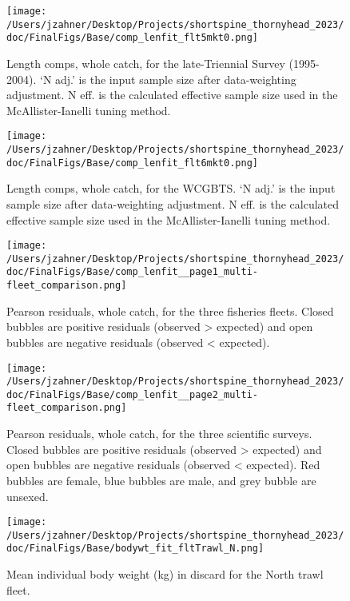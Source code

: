 \documentclass[11pt,
  english,
  letterpaper,
]{article}
\begin{document}
\begin{figure}
\centering
\texttt{[image: /Users/jzahner/Desktop/Projects/shortspine\_thornyhead\_2023/doc/FinalFigs/Base/comp\_lenfit\_flt5mkt0.png]}
\caption{Length comps, whole catch, for the late-Triennial Survey (1995-2004). `N adj.' is the input sample size after data-weighting adjustment. N eff. is the calculated effective sample size used in the McAllister-Ianelli tuning method.\label{fig:fits_ltri}}
\end{figure}

\begin{figure}
\centering
\texttt{[image: /Users/jzahner/Desktop/Projects/shortspine\_thornyhead\_2023/doc/FinalFigs/Base/comp\_lenfit\_flt6mkt0.png]}
\caption{Length comps, whole catch, for the WCGBTS. `N adj.' is the input sample size after data-weighting adjustment. N eff. is the calculated effective sample size used in the McAllister-Ianelli tuning method.\label{fig:fits_wcgbts}}
\end{figure}

\begin{figure}
\centering
\texttt{[image: /Users/jzahner/Desktop/Projects/shortspine\_thornyhead\_2023/doc/FinalFigs/Base/comp\_lenfit\_\_page1\_multi-fleet\_comparison.png]}
\caption{Pearson residuals, whole catch, for the three fisheries fleets. Closed bubbles are positive residuals (observed \textgreater{} expected) and open bubbles are negative residuals (observed \textless{} expected).\label{fig:resids_fisheries}}
\end{figure}

\begin{figure}
\centering
\texttt{[image: /Users/jzahner/Desktop/Projects/shortspine\_thornyhead\_2023/doc/FinalFigs/Base/comp\_lenfit\_\_page2\_multi-fleet\_comparison.png]}
\caption{Pearson residuals, whole catch, for the three scientific surveys. Closed bubbles are positive residuals (observed \textgreater{} expected) and open bubbles are negative residuals (observed \textless{} expected). Red bubbles are female, blue bubbles are male, and grey bubble are unsexed.\label{fig:resids_survey}}
\end{figure}

\begin{figure}
\centering
\texttt{[image: /Users/jzahner/Desktop/Projects/shortspine\_thornyhead\_2023/doc/FinalFigs/Base/bodywt\_fit\_fltTrawl\_N.png]}
\caption{Mean individual body weight (kg) in discard for the North trawl fleet.\label{fig:weightNorthTrl}}
\end{figure}
\end{document}
